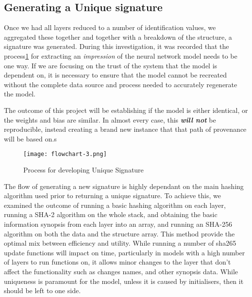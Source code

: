 \subsection{Generating a Unique signature}
Once we had all layers reduced to a number of identification values, we aggregated these together and together with a breakdown of the structure, a signature was generated. During this investigation, it was recorded that the process\ref{fig_sig_generator} for extracting an \textit{impression} of the neural network model needs to be one way. If we are focusing on the trust of the system that the model is dependent on, it is necessary to ensure that the model cannot be recreated without the complete data source and process needed to accurately regenerate the model.

The outcome of this project will be establishing if the model is either identical, or the weights and bias are similar. In almost every case, this \textit{\textbf{will not}} be reproducible, instead creating a brand new instance that that path of provenance will be based on.s

\begin{figure}[!ht]
    \centering
    \texttt{[image: flowchart-3.png]}
    \caption{Process for developing Unique Signature}
    \label{fig_sig_generator}
\end{figure}

The flow of generating a new signature is highly dependant on the main hashing algorithm used prior to returning a unique signature. To achieve this, we examined the outcome of running a basic hashing algorithm on each layer, running a SHA-2\cite{technologySecureHashStandard2015} algorithm on the whole stack, and obtaining the basic information synopsis from each layer into an array, and running an SHA-256 algorithm on both the data and the structure array. This method provide the optimal mix between efficiency and utility. While running a number of sha265 update functions will impact on time, particularly in models with a high number of layers to run functions on, it allows minor changes to the layer that don't affect the functionality such as changes names, and other synopsis data. While uniqueness is paramount for the model, unless it is caused by initialisers, then it should be left to one side.

